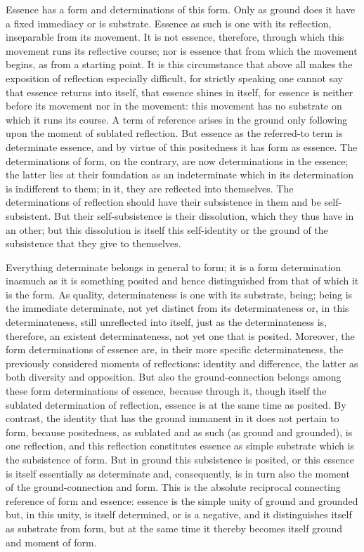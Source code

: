 Essence has a form and determinations of this form.
Only as ground does it have a fixed immediacy or is substrate.
Essence as such is one with its reflection,
inseparable from its movement.
It is not essence, therefore, through which
this movement runs its reflective course;
nor is essence that from which the movement begins,
as from a starting point.
It is this circumstance that above all makes
the exposition of reflection especially difficult,
for strictly speaking one cannot say
that essence returns into itself,
that essence shines in itself,
for essence is neither before its movement nor in the movement:
this movement has no substrate on which it runs its course.
A term of reference arises in the ground only following upon the
moment of sublated reflection.
But essence as the referred-to term is determinate essence,
and by virtue of this positedness it has form as essence.
The determinations of form, on the contrary,
are now determinations in the essence;
the latter lies at their foundation
as an indeterminate which in its determination
is indifferent to them;
in it, they are reflected into themselves.
The determinations of reflection should have
their subsistence in them and be self-subsistent.
But their self-subsistence is their dissolution,
which they thus have in an other;
but this dissolution is itself this self-identity
or the ground of the subsistence that they give to themselves.

Everything determinate belongs in general to form;
it is a form determination inasmuch as it is something posited
and hence distinguished from that of which it is the form.
As quality, determinateness is one with its substrate, being;
being is the immediate determinate,
not yet distinct from its determinateness
or, in this determinateness,
still unreflected into itself,
just as the determinateness is, therefore,
an existent determinateness,
not yet one that is posited.
Moreover, the form determinations of essence are,
in their more specific determinateness,
the previously considered moments of reflections:
identity and difference, the latter as both
diversity and opposition.
But also the ground-connection belongs among
these form determinations of essence,
because through it, though itself the
sublated determination of reflection,
essence is at the same time as posited.
By contrast, the identity that has the ground immanent in it
does not pertain to form, because positedness,
as sublated and as such (as ground and grounded),
is one reflection, and this reflection constitutes
essence as simple substrate which is the subsistence of form.
But in ground this subsistence is posited,
or this essence is itself essentially as determinate and, consequently,
is in turn also the moment of the ground-connection and form.
This is the absolute reciprocal connecting reference of form and essence:
essence is the simple unity of ground and grounded
but, in this unity, is itself determined, or is a negative,
and it distinguishes itself as substrate from form,
but at the same time it thereby becomes itself
ground and moment of form.

